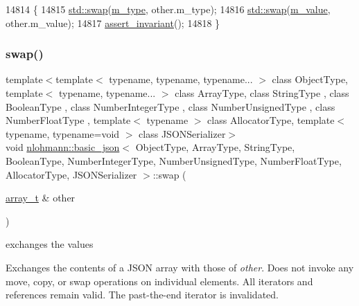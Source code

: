 \begin{DoxyCode}
14814     \{
14815         \hyperlink{json_8hpp_a907191b7578e209391ce938e3b2afdf7}{std::swap}(\hyperlink{classnlohmann_1_1basic__json_a91990b60d7d4d67968a2c1db677536e7}{m\_type}, other.m\_type);
14816         \hyperlink{json_8hpp_a907191b7578e209391ce938e3b2afdf7}{std::swap}(\hyperlink{classnlohmann_1_1basic__json_aeb0814f76966f99290cb29e127c90a77}{m\_value}, other.m\_value);
14817         \hyperlink{classnlohmann_1_1basic__json_a4a82d3fb7a111641decf35c2fb707c7f}{assert\_invariant}();
14818     \}
\end{DoxyCode}
\mbox{\label{classnlohmann_1_1basic__json_a65b0a24e1361a030ad0a661de22f6c8e}} 
\subsubsection{\texorpdfstring{swap()}{swap()}\hspace{0.1cm}{\footnotesize\ttfamily [2/4]}}
{\footnotesize\ttfamily template$<$template$<$ typename, typename, typename... $>$ class Object\+Type, template$<$ typename, typename... $>$ class Array\+Type, class String\+Type , class Boolean\+Type , class Number\+Integer\+Type , class Number\+Unsigned\+Type , class Number\+Float\+Type , template$<$ typename $>$ class Allocator\+Type, template$<$ typename, typename=void $>$ class J\+S\+O\+N\+Serializer$>$ \\
void \hyperlink{classnlohmann_1_1basic__json}{nlohmann\+::basic\+\_\+json}$<$ Object\+Type, Array\+Type, String\+Type, Boolean\+Type, Number\+Integer\+Type, Number\+Unsigned\+Type, Number\+Float\+Type, Allocator\+Type, J\+S\+O\+N\+Serializer $>$\+::swap (\begin{DoxyParamCaption}\item[{\hyperlink{classnlohmann_1_1basic__json_ae095578e03df97c5b3991787f1056374}{array\+\_\+t} \&}]{other }\end{DoxyParamCaption})\hspace{0.3cm}{\ttfamily [inline]}}



exchanges the values 

Exchanges the contents of a J\+S\+ON array with those of {\itshape other}. Does not invoke any move, copy, or swap operations on individual elements. All iterators and references remain valid. The past-\/the-\/end iterator is invalidated.



